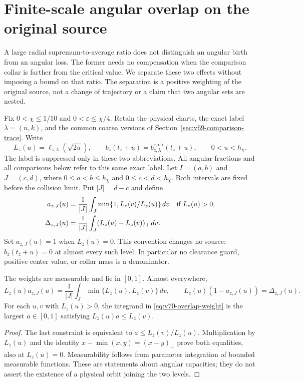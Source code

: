 \section{Finite-scale angular overlap on the original source}
\label{sec:v70-angular-overlap}
A large radial supremum-to-average ratio does not distinguish an
angular birth from an angular loss. The former needs no compensation
when the comparison collar is farther from the critical value. We
separate these two effects without imposing a bound on that ratio.
The separation is a positive weighting of the original source, not a
change of trajectory or a claim that two angular sets are nested.

Fix $0<\chi\le1/10$ and $0<\varepsilon\le\chi/4$. Retain the
physical charts, the exact label $\lambda=(n,k)$, and the common
coarea versions of Section~\ref{sec:v69-comparison-trace}. Write
\[
 L_z(u)=\ell_{z,\lambda}(\sqrt{2u}),\qquad
 b_z(t_z+u)=b_{z,\lambda}^{\varepsilon,\mathrm{clr}}(t_z+u),
 \qquad 0<u<h_\chi.
\]
The label is suppressed only in these two abbreviations. All angular
fractions and all comparisons below refer to this same exact label.
Let $I=(a,b)$ and $J=(c,d)$, where
$0\le a<b\le h_\chi$ and $0\le c<d<h_\chi$. Both intervals
are fixed before the collision limit. Put $|J|=d-c$ and define
\begin{align}
 a_{z,J}(u)&=\frac1{|J|}\int_J
       \min\{1,L_z(v)/L_z(u)\}\,dv\quad\hbox{if }L_z(u)>0,
                                      \label{eq:v70-overlap-weight}\\
 \Delta_{z,J}(u)&=\frac1{|J|}\int_J(L_z(u)-L_z(v))_+\,dv.
                                      \label{eq:v70-angular-loss}
\end{align}
Set $a_{z,J}(u)=1$ when $L_z(u)=0$. This convention changes no
source: $b_z(t_z+u)=0$ at almost every such level. In particular no
clearance guard, positive center value, or collar mass is a denominator.

\begin{lemma}
\label{lem:v70-scalar-overlap}
The weights are measurable and lie in $[0,1]$. Almost everywhere,
\begin{equation}\label{eq:v70-capacity-identity}
 L_z(u)a_{z,J}(u)=\frac1{|J|}\int_J\min\{L_z(u),L_z(v)\}\,dv,
 \qquad L_z(u)(1-a_{z,J}(u))=\Delta_{z,J}(u).
\end{equation}
For each $u,v$ with $L_z(u)>0$, the integrand in
\eqref{eq:v70-overlap-weight} is the largest $a\in[0,1]$ satisfying
$L_z(u)a\le L_z(v)$.
\end{lemma}
\begin{proof}
The last constraint is equivalent to $a\le L_z(v)/L_z(u)$.
Multiplication by $L_z(u)$ and the identity
$x-\min(x,y)=(x-y)_+$ prove both equalities, also at $L_z(u)=0$.
Measurability follows from parameter integration of bounded measurable
functions. These are statements about angular capacities; they do not
assert the existence of a physical orbit joining the two levels.
\end{proof}

